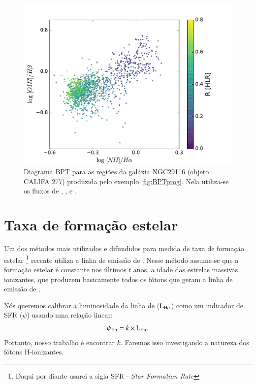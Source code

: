 \begin{figure}
	\centering
	\includegraphics[scale=0.6]{figuras/K0277-BPT.pdf}
	\caption[Diagrama BPT produzido pelo programa no exemplo da Fig. \ref{fig:BPTprog}.]
	{Diagrama BPT para as regiões da galáxia NGC29116 (objeto CALIFA 277) produzida pelo exemplo
	\ref{fig:BPTprog}. Nela utiliza-se os fluxos de \Halpha, \Hbeta, \OIII e \NII.}
	\label{fig:BPTfig}
\end{figure}

\section{Taxa de formação estelar}
\label{sec:emlines:SFR}

Um dos métodos mais utilizados e difundidos para medida de taxa de formação estelar \footnote{Daqui
por diante usarei a sigla SFR - {\em Star Formation Rate}} recente utiliza a linha de emissão de
\Halpha. Nesse método assume-se que a formação estelar é constante nos últimos $t$ anos, a idade das
estrelas massivas ionizantes, que produzem basicamente todos os fótons que geram a linha de emissão
de \Halpha.

Nós queremos calibrar a luminosidade da linha de \Halpha ($\LHalpha$) como um indicador
de SFR ($\psi$) usando uma relação linear:
\begin{equation}
	\psi_{\Halpha} = k \times \LHalpha.
	\label{eq:SFRHa}
\end{equation}
\noindent Portanto, nosso trabalho é encontrar $k$. Faremos isso investigando a natureza dos 
fótons H-ionizantes.


